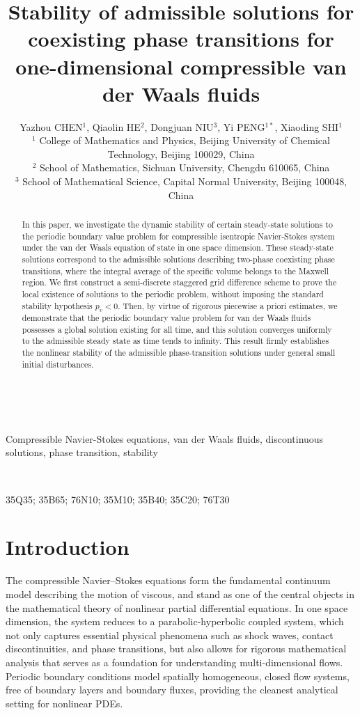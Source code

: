 \documentclass[a4paper,oneside,11pt]{article}
\title{Stability of admissible solutions for coexisting phase transitions for one-dimensional compressible van der Waals fluids}
\date{  }
\author{Yazhou C{\small HEN}$^1$, Qiaolin H{\small E}$^2$, Dongjuan N{\small IU}$^{3}$, Yi P{\small ENG}$^{1*}$, Xiaoding S{\small HI}$^{1}$ \\[3mm]
\scriptsize$^{1}$ {College of Mathematics and Physics, Beijing University of
Chemical Technology, Beijing 100029, China}\\
\scriptsize$^{2}$ {School of Mathematics, Sichuan University, Chengdu 610065,  China}\\
\scriptsize$^{3}$ {School of Mathematical Science, Capital Normal University, Beijing 100048, China }
}
\numberwithin{equation}{section}
\renewcommand{\thefootnote}{}
\begin{document}
\maketitle
\renewcommand{\thefootnote}{\fnsymbol{footnote}}

   
\begin{abstract}
In this paper, we investigate the dynamic stability of certain steady-state solutions to the periodic boundary value problem for compressible isentropic Navier-Stokes system under the van der Waals equation of state in one space dimension. 
These steady-state solutions correspond to the admissible solutions describing two-phase coexisting phase transitions, where the integral average of the specific volume belongs to the Maxwell region. 
We first construct a semi-discrete staggered grid difference scheme to prove the local existence of solutions to the periodic problem, without imposing the standard stability hypothesis \(p_v<0\). 
Then, by virtue of rigorous piecewise a priori estimates, we demonstrate that the periodic boundary value problem for van der Waals fluids possesses a global solution existing for all time, and this solution converges uniformly to the admissible steady state as time tends to infinity. This result firmly establishes the nonlinear stability of the admissible phase-transition solutions under general small initial disturbances. 

\end{abstract} 

\

   Compressible Navier-Stokes equations, van der Waals fluids, discontinuous solutions, phase transition, stability  

\

 35Q35; 35B65; 76N10; 35M10; 35B40; 35C20; 76T30

\section{Introduction}\label{sec:int}
\indent\qquad
The compressible Navier--Stokes equations form the fundamental continuum model describing the motion of viscous,  and stand as one of the central objects in the mathematical theory of nonlinear partial differential equations.
In one space dimension, the system reduces to a parabolic-hyperbolic coupled system, which not only captures essential physical phenomena such as shock waves, contact discontinuities, and phase transitions, but also allows for rigorous mathematical analysis that serves as a foundation for understanding multi-dimensional flows. Periodic boundary conditions model spatially homogeneous, closed flow systems, free of boundary layers and boundary fluxes, providing the cleanest analytical setting for nonlinear PDEs.
\end{document}
